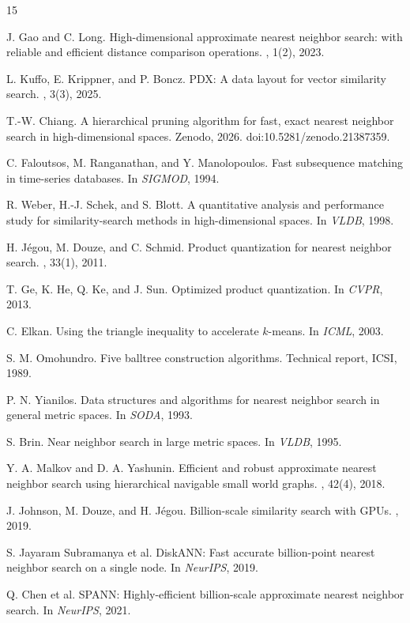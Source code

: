 \documentclass[sigconf,nonacm]{acmart}
\begin{document}
\begin{thebibliography}{15}

J. Gao and C. Long.
\newblock High-dimensional approximate nearest neighbor search: with
  reliable and efficient distance comparison operations.
, 1(2), 2023.

L. Kuffo, E. Krippner, and P. Boncz.
\newblock PDX: A data layout for vector similarity search.
, 3(3), 2025.

T.-W. Chiang.
\newblock A hierarchical pruning algorithm for fast, exact nearest neighbor
  search in high-dimensional spaces.
\newblock Zenodo, 2026. doi:10.5281/zenodo.21387359.

C. Faloutsos, M. Ranganathan, and Y. Manolopoulos.
\newblock Fast subsequence matching in time-series databases.
\newblock In {\em SIGMOD}, 1994.

R. Weber, H.-J. Schek, and S. Blott.
\newblock A quantitative analysis and performance study for similarity-search
  methods in high-dimensional spaces.
\newblock In {\em VLDB}, 1998.

H. J{\'e}gou, M. Douze, and C. Schmid.
\newblock Product quantization for nearest neighbor search.
, 33(1), 2011.

T. Ge, K. He, Q. Ke, and J. Sun.
\newblock Optimized product quantization.
\newblock In {\em CVPR}, 2013.

C. Elkan.
\newblock Using the triangle inequality to accelerate $k$-means.
\newblock In {\em ICML}, 2003.

S. M. Omohundro.
\newblock Five balltree construction algorithms.
\newblock Technical report, ICSI, 1989.

P. N. Yianilos.
\newblock Data structures and algorithms for nearest neighbor search in
  general metric spaces.
\newblock In {\em SODA}, 1993.

S. Brin.
\newblock Near neighbor search in large metric spaces.
\newblock In {\em VLDB}, 1995.

Y. A. Malkov and D. A. Yashunin.
\newblock Efficient and robust approximate nearest neighbor search using
  hierarchical navigable small world graphs.
, 42(4), 2018.

J. Johnson, M. Douze, and H. J{\'e}gou.
\newblock Billion-scale similarity search with GPUs.
, 2019.

S. Jayaram Subramanya et al.
\newblock DiskANN: Fast accurate billion-point nearest neighbor search on a
  single node.
\newblock In {\em NeurIPS}, 2019.

Q. Chen et al.
\newblock SPANN: Highly-efficient billion-scale approximate nearest neighbor
  search.
\newblock In {\em NeurIPS}, 2021.

\end{thebibliography}
\end{document}
